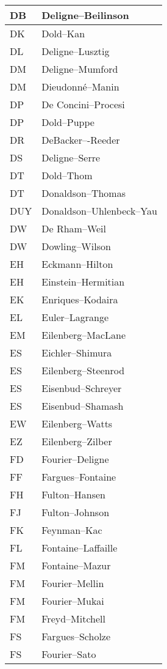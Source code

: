 \documentclass{amsart}
\numberwithin{equation}{section}
\theoremstyle{plain}
\numberwithin{equation}{section}
\theoremstyle{remark}
\begin{document}
\begin{multicols}{2}
{\begin{longtable}{l|l}
DB & Deligne--Beilinson\\ \hline
DK & Dold--Kan\\ \hline
DL & Deligne--Lusztig\\ \hline
DM & Deligne--Mumford\\ \hline
DM & Dieudonné--Manin\\ \hline
DP & De Concini--Procesi\\ \hline
DP & Dold--Puppe\\ \hline
DR & DeBacker–-Reeder\\ \hline
DS & Deligne--Serre \\ \hline
DT & Dold--Thom\\ \hline
DT & Donaldson--Thomas\\ \hline
DUY & Donaldson--Uhlenbeck--Yau\\ \hline
DW & De Rham--Weil\\ \hline
DW & Dowling--Wilson\\ \hline
EH & Eckmann--Hilton\\ \hline
EH & Einstein--Hermitian\\ \hline
EK & Enriques--Kodaira\\ \hline
EL & Euler--Lagrange\\ \hline
EM & Eilenberg--MacLane\\ \hline
ES & Eichler--Shimura\\ \hline
ES & Eilenberg--Steenrod\\ \hline
ES & Eisenbud--Schreyer\\ \hline
ES & Eisenbud--Shamash\\ \hline
EW & Eilenberg--Watts\\ \hline
EZ & Eilenberg--Zilber\\ \hline
FD & Fourier--Deligne\\ \hline
FF & Fargues--Fontaine\\ \hline
FH & Fulton--Hansen\\ \hline
FJ & Fulton--Johnson\\ \hline
FK & Feynman--Kac\\ \hline
FL & Fontaine--Laffaille\\ \hline
FM & Fontaine--Mazur\\ \hline
FM & Fourier--Mellin\\ \hline
FM & Fourier--Mukai\\ \hline
FM & Freyd--Mitchell\\ \hline
FS & Fargues--Scholze\\ \hline
FS & Fourier--Sato\\ \hline

\end{longtable}}
\end{multicols}
\end{document}
